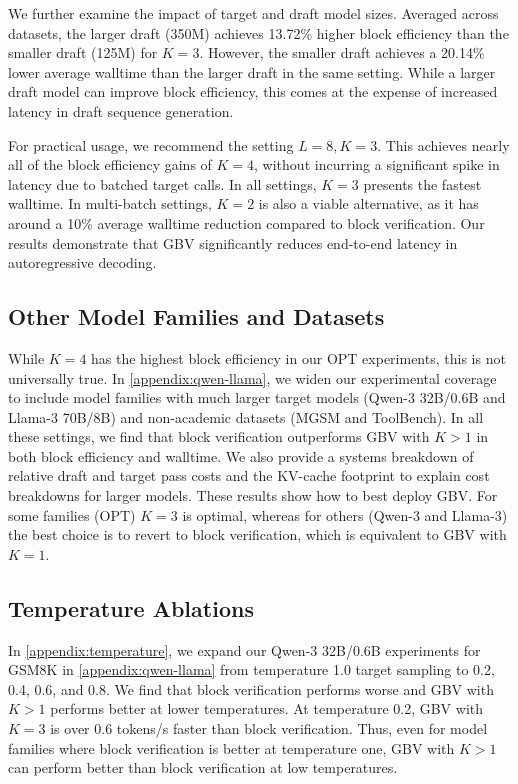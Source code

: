 \documentclass{article}
\theoremstyle{plain}
\theoremstyle{definition}
\theoremstyle{remark}
\begin{document}
We further examine the impact of target and draft model sizes. Averaged across datasets, the larger draft (350M) achieves 13.72\% higher block efficiency than the smaller draft (125M) for $K=3$. However, the smaller draft achieves a 20.14\% lower average walltime than the larger draft in the same setting. While a larger draft model can improve block efficiency, this comes at the expense of increased latency in draft sequence generation. 

For practical usage, we recommend the setting $L=8,K=3$. This achieves nearly all of the block efficiency gains of $K=4$, without incurring a significant spike in latency due to batched target calls. In all settings, $K=3$ presents the fastest walltime. In multi-batch settings, $K=2$ is also a viable alternative, as it has around a 10\% average walltime reduction compared to block verification. Our results demonstrate that GBV significantly reduces end-to-end latency in autoregressive decoding.

\subsection{Other Model Families and Datasets}
\label{subsec:models}

While $K=4$ has the highest block efficiency in our OPT experiments, this is not universally true. In \cref{appendix:qwen-llama}, we widen our experimental coverage to include model families with much larger target models (Qwen-3 32B/0.6B and Llama-3 70B/8B) and non-academic datasets (MGSM and ToolBench). In all these settings, we find that block verification outperforms GBV with $K>1$ in both block efficiency and walltime. We also provide a systems breakdown of relative draft and target pass costs and the KV-cache footprint to explain cost breakdowns for larger models. These results show how to best deploy GBV. For some families (OPT) $K=3$ is optimal, whereas for others (Qwen-3 and Llama-3) the best choice is to revert to block verification, which is equivalent to GBV with $K=1$. 

\subsection{Temperature Ablations}
\label{subsec:temp}

In \cref{appendix:temperature}, we expand our Qwen-3 32B/0.6B experiments for GSM8K in \cref{appendix:qwen-llama} from temperature 1.0 target sampling to 0.2, 0.4, 0.6, and 0.8. We find that block verification performs worse and GBV with $K>1$ performs better at lower temperatures. At temperature 0.2, GBV with $K=3$ is over 0.6 tokens/s faster than block verification. Thus, even for model families where block verification is better at temperature one, GBV with $K>1$ can perform better than block verification at low temperatures.
\end{document}
